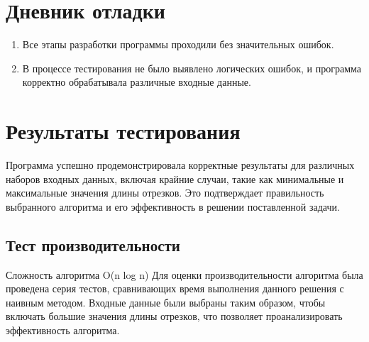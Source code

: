 \documentclass[12pt,a4paper]{article}
\begin{document}
\section*{Дневник отладки}
\begin{enumerate}
    \item Все этапы разработки программы проходили без значительных ошибок.
    \item В процессе тестирования не было выявлено логических ошибок, и программа корректно обрабатывала различные входные данные.
\end{enumerate}

\section*{Результаты тестирования}
Программа успешно продемонстрировала корректные результаты для различных наборов входных данных, включая крайние случаи, такие как минимальные и максимальные значения длины отрезков. Это подтверждает правильность выбранного алгоритма и его эффективность в решении поставленной задачи.

\subsection*{Тест производительности}
Сложность алгоритма O(n log n)
Для оценки производительности алгоритма была проведена серия тестов, сравнивающих время выполнения данного решения с наивным методом. Входные данные были выбраны таким образом, чтобы включать большие значения длины отрезков, что позволяет проанализировать эффективность алгоритма.

\begin{figure}[htbp]
    \centering
    \label{fig:graph}
\end{figure}
\end{document}
